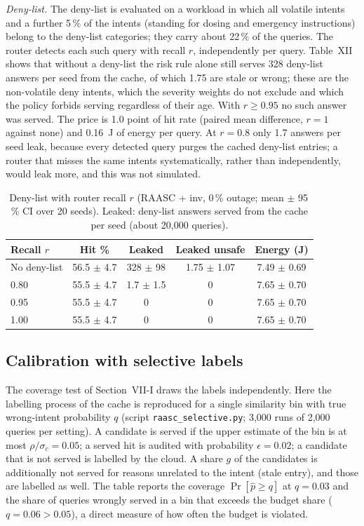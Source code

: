 \emph{Deny-list.} The deny-list is evaluated on a workload in which all volatile intents and a further 5\,\% of the intents (standing for dosing and emergency instructions) belong to the deny-list categories; they carry about 22\,\% of the queries. The router detects each such query with recall $r$, independently per query. Table~XII shows that without a deny-list the risk rule alone still serves 328 deny-list answers per seed from the cache, of which 1.75 are stale or wrong; these are the non-volatile deny intents, which the severity weights do not exclude and which the policy forbids serving regardless of their age. With $r\ge0.95$ no such answer was served. The price is 1.0 point of hit rate (paired mean difference, $r=1$ against none) and 0.16~J of energy per query. At $r=0.8$ only 1.7 answers per seed leak, because every detected query purges the cached deny-list entries; a router that misses the same intents systematically, rather than independently, would leak more, and this was not simulated.

\begin{table}[t]
\centering
\caption{Deny-list with router recall $r$ (RAASC + inv, 0\,\% outage; mean $\pm$ 95\,\% CI over 20 seeds). Leaked: deny-list answers served from the cache per seed (about 20,000 queries).}
\label{tab:suppXII}
\footnotesize
\begin{tabular}{@{}lcccc@{}}
\toprule
Recall $r$ & Hit \% & Leaked & Leaked unsafe & Energy (J)\\
\midrule
No deny-list & 56.5 $\pm$ 4.7 & 328 $\pm$ 98 & 1.75 $\pm$ 1.07 & 7.49 $\pm$ 0.69\\
0.80 & 55.5 $\pm$ 4.7 & 1.7 $\pm$ 1.5 & 0 & 7.65 $\pm$ 0.70\\
0.95 & 55.5 $\pm$ 4.7 & 0 & 0 & 7.65 $\pm$ 0.70\\
1.00 & 55.5 $\pm$ 4.7 & 0 & 0 & 7.65 $\pm$ 0.70\\
\bottomrule
\end{tabular}
\end{table}

\subsection{Calibration with selective labels}
The coverage test of Section~VII-I draws the labels independently. Here the labelling process of the cache is reproduced for a single similarity bin with true wrong-intent probability $q$ (script \texttt{raasc\_selective.py}; 3,000 runs of 2,000 queries per setting). A candidate is served if the upper estimate of the bin is at most $\rho/\sigma_c=0.05$; a served hit is audited with probability $\epsilon=0.02$; a candidate that is not served is labelled by the cloud. A share $g$ of the candidates is additionally not served for reasons unrelated to the intent (stale entry), and those are labelled as well. The table reports the coverage $\Pr[\hat p\ge q]$ at $q=0.03$ and the share of queries wrongly served in a bin that exceeds the budget share ($q=0.06>0.05$), a direct measure of how often the budget is violated.

